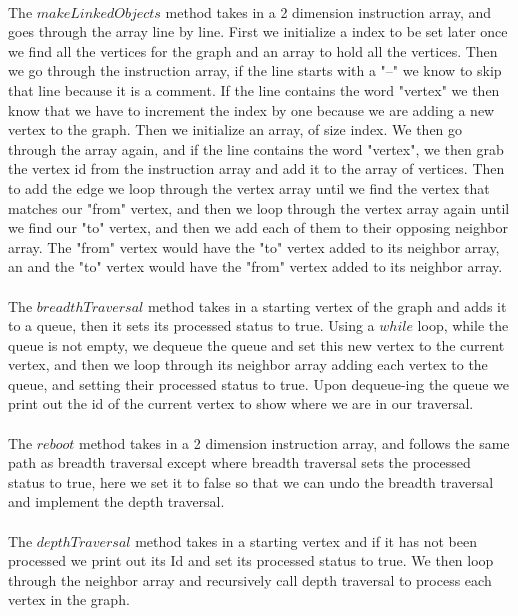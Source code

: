 \documentclass[letterpaper, 10pt,DIV=13]{scrartcl}
\numberwithin{equation}{section} %
\numberwithin{figure}{section} %
\numberwithin{table}{section} %
\begin{document}
\paragraph{} The $makeLinkedObjects$ method takes in a 2 dimension instruction array, and goes through the array line by line. First we initialize a index to be set later once we find all the vertices for the graph and an array to hold all the vertices. Then we go through the instruction array, if the line starts with a "--" we know to skip that line because it is a comment. If the line contains the word "vertex" we then know that we have to increment the index by one because we are adding a new vertex to the graph. Then we initialize an array, of size index. We then go through the array again, and if the line contains the word "vertex", we then grab the vertex id from the instruction array and add it to the array of vertices. Then to add the edge we loop through the vertex array until we find the vertex that matches our "from" vertex, and then we loop through the vertex array again until we find our "to" vertex, and then we add each of them to their opposing neighbor array. The "from" vertex would have the "to" vertex added to its neighbor array, an and the "to" vertex would have the "from" vertex added to its neighbor array.

\paragraph{} The $breadthTraversal$ method takes in a starting vertex of the graph and adds it to a queue, then it sets its processed status to true. Using a $while$ loop, while the queue is not empty, we dequeue the queue and set this new vertex to the current vertex, and then we loop through its neighbor array adding each vertex to the queue, and setting their processed status to true. Upon dequeue-ing the queue we print out the id of the current vertex to show where we are in our traversal. 

\paragraph{} The $reboot$ method takes in a 2 dimension instruction array, and follows the same path as breadth traversal except where breadth traversal sets the processed status to true, here we set it to false so that we can undo the breadth traversal and implement the depth traversal.

\paragraph{} The $depthTraversal$ method takes in a starting vertex and if it has not been processed we print out its Id and set its processed status to true. We then loop through the neighbor array and recursively call depth traversal to process each vertex in the graph.
\end{document}
